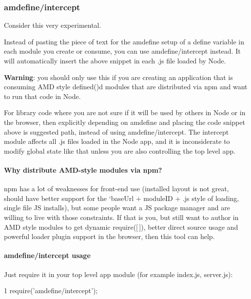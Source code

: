 \subsubsection*{amdefine/intercept}

Consider this very experimental.

Instead of pasting the piece of text for the amdefine setup of a {\ttfamily define} variable in each module you create or consume, you can use {\ttfamily amdefine/intercept} instead. It will automatically insert the above snippet in each .js file loaded by Node.

{\bfseries Warning}\+: you should only use this if you are creating an application that is consuming A\+M\+D style defined()\textquotesingle{}d modules that are distributed via npm and want to run that code in Node.

For library code where you are not sure if it will be used by others in Node or in the browser, then explicitly depending on amdefine and placing the code snippet above is suggested path, instead of using {\ttfamily amdefine/intercept}. The intercept module affects all .js files loaded in the Node app, and it is inconsiderate to modify global state like that unless you are also controlling the top level app.

\paragraph*{Why distribute A\+M\+D-\/style modules via npm?}

npm has a lot of weaknesses for front-\/end use (installed layout is not great, should have better support for the `base\+Url + module\+I\+D + \textquotesingle{}.js\textquotesingle{} style of loading, single file J\+S installs), but some people want a J\+S package manager and are willing to live with those constraints. If that is you, but still want to author in A\+M\+D style modules to get dynamic require(\mbox{[}$\,$\mbox{]}), better direct source usage and powerful loader plugin support in the browser, then this tool can help.

\paragraph*{amdefine/intercept usage}

Just require it in your top level app module (for example index.\+js, server.\+js)\+:


\begin{DoxyCode}
1 require('amdefine/intercept');
\end{DoxyCode}


